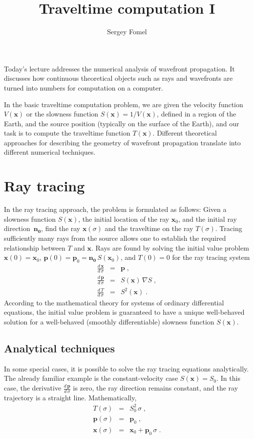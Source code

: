 \documentclass[12pt]{handout}
\begin{document}
\author{Sergey Fomel}
\title{Traveltime computation I}

Today's lecture addresses the numerical analysis of wavefront propagation. It
discusses how continuous theoretical objects such as rays and
wavefronts are turned into numbers for computation on a computer.

In the basic traveltime computation problem, we are given the velocity
function $V(\mathbf{x})$ or the slowness function
$S(\mathbf{x})=1/V(\mathbf{x})$, defined in a region of the Earth, and the
source position (typically on the surface of the Earth), and our task is to
compute the traveltime function $T(\mathbf{x})$. Different theoretical
approaches for describing the geometry of wavefront propagation translate into
different numerical techniques.

\section{Ray tracing}

In the ray tracing approach, the problem is formulated as follows:
Given a slowness function $S(\mathbf{x})$, the initial location of the
ray $\mathbf{x}_0$, and the initial ray direction~$\mathbf{n_0}$, find
the ray $\mathbf{x}(\sigma)$ and the traveltime on the ray
$T(\sigma)$. Tracing sufficiently many rays from the source allows one
to establish the required relationship between $T$ and
$\mathbf{x}$. Rays are found by solving the initial value problem
$\mathbf{x}(0)=\mathbf{x}_0$, $\mathbf{p}(0)=\mathbf{p}_0 =
\mathbf{n_0}\,S(\mathbf{x}_0)$, and $T(0) = 0$ for the ray tracing system
\begin{eqnarray}
  \label{eq:xray}
  \frac{d\,\mathbf{x}}{d\,\sigma} & = & \mathbf{p}\;, \\
  \label{eq:pray}
  \frac{d\,\mathbf{p}}{d\,\sigma} & = & S(\mathbf{x})\,\nabla S\;, \\
  \label{eq:tray}
  \frac{d\,T}{d\,\sigma} & = & S^2(\mathbf{x})\;.
\end{eqnarray}
According to the mathematical theory for systems of ordinary
differential equations, the initial value problem is guaranteed to
have a unique well-behaved solution for a well-behaved (smoothly
differentiable) slowness function $S(\mathbf{x})$.

\subsection{Analytical techniques}

In some special cases, it is possible to solve the ray tracing
equations analytically. The already familiar example is the
constant-velocity case $S(\mathbf{x}) = S_0$. In this case, the
derivative $\frac{d\,\mathbf{p}}{d\,\sigma}$ is zero, the ray
direction remains constant, and the ray trajectory is a straight
line. Mathematically,
\begin{eqnarray}
  \label{eq:tconst}
  T(\sigma) & = & S_0^2\,\sigma\;, \\
  \label{eq:pconst}
  \mathbf{p}(\sigma) & = & \mathbf{p}_0\;, \\
  \label{eq:xconst}
  \mathbf{x}(\sigma) & = & 
  \mathbf{x}_0 + \mathbf{p}_0\,\sigma\;.
\end{eqnarray}
\end{document}
